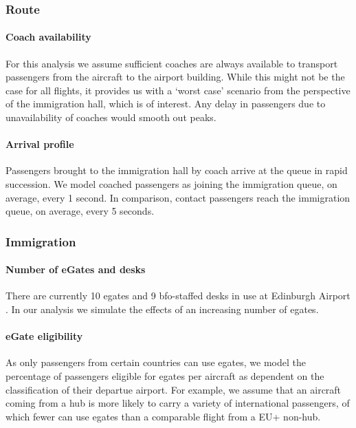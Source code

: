 \documentclass[10pt]{article}
\begin{document}
\subsubsection{Route}

\paragraph{Coach availability}
For this analysis we assume sufficient coaches are always available to transport passengers from the aircraft to the airport building. While this might not be the case for all flights, it provides us with a `worst case' scenario from the perspective of the immigration hall, which is of interest. Any delay in passengers due to unavailability of coaches would smooth out peaks.

\paragraph{Arrival profile} 
 Passengers brought to the immigration hall by coach arrive at the queue in rapid succession. We model coached passengers as joining the immigration queue, on average, every 1 second. In comparison, contact passengers reach the immigration queue, on average, every 5 seconds.



\subsubsection{Immigration} \label{subsec:choices_immigration}

\paragraph{Number of eGates and desks} There are currently 10 \glspl{egate} and 9 \gls{bfo}-staffed desks in use at Edinburgh Airport \cite{modelling_competition}. In our analysis we simulate the effects of an increasing number of \glspl{egate}.

\paragraph{eGate eligibility}
As only passengers from certain countries can use \glspl{egate}, we model the percentage of passengers eligible for \glspl{egate} per aircraft as dependent on the classification of their departue airport. For example, we assume that an aircraft coming from a hub is more likely to carry a variety of international passengers, of which fewer can use \glspl{egate} than a comparable flight from a EU+ non-hub. 
\end{document}
